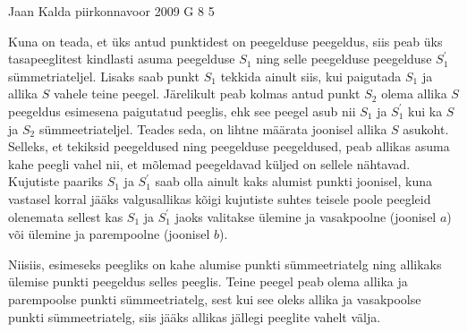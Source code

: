 \documentclass[11pt]{article}
\begin{document}
{%
{Jaan Kalda} %
{piirkonnavoor} %
{2009} %
{G 8} %
{5} %
{

\ifSolution
Kuna on teada, et üks antud punktidest on peegelduse peegeldus, siis peab üks tasapeeglitest kindlasti asuma peegelduse $S_1$ ning selle peegelduse peegelduse $S_1^\prime$ sümmetriateljel. Lisaks saab punkt $S_1$ tekkida ainult siis, kui paigutada $S_1$ ja allika $S$ vahele teine peegel. Järelikult peab kolmas antud punkt $S_2$ olema allika $S$ peegeldus esimesena paigutatud peeglis, ehk see peegel asub nii $S_1$ ja $S_1^\prime$ kui ka $S$ ja $S_2$ sümmeetriateljel. Teades seda, on lihtne määrata joonisel allika $S$ asukoht. Selleks, et tekiksid peegeldused ning peegelduse peegeldused, peab allikas asuma kahe peegli vahel nii, et mõlemad peegeldavad küljed on sellele nähtavad. Kujutiste paariks $S_1$ ja $S_1^\prime$ saab olla ainult kaks alumist punkti joonisel, kuna vastasel korral jääks valgusallikas kõigi kujutiste suhtes teisele poole peegleid olenemata sellest kas $S_1$ ja $S_1^\prime$ jaoks valitakse ülemine ja vasakpoolne (joonisel $a$) või ülemine ja parempoolne (joonisel $b$).

Niisiis, esimeseks peegliks on kahe alumise punkti sümmeetriatelg ning allikaks ülemise punkti peegeldus selles peeglis. Teine peegel peab olema allika ja parempoolse punkti sümmeetriatelg, sest kui see oleks allika ja vasakpoolse punkti sümmeetriatelg, siis jääks allikas jällegi peeglite vahelt välja.\\

}}
\end{document}
